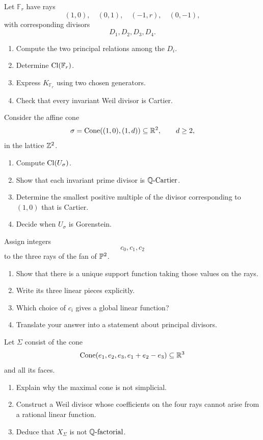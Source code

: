 \begin{exercises}
\item Let \(\mathbb F_r\) have rays
\[
(1,0),\quad
(0,1),\quad
(-1,r),\quad
(0,-1),
\]
with corresponding divisors
\[
D_1,D_2,D_3,D_4.
\]
\begin{enumerate}[label=(\alph*),wide=0pt]
\item Compute the two principal relations among the \(D_i\).
\item Determine \(\operatorname{Cl}(\mathbb F_r)\).
\item Express \(K_{\mathbb F_r}\) using two chosen generators.
\item Check that every invariant Weil divisor is Cartier.
\end{enumerate}

\item Consider the affine cone
\[
\sigma=\operatorname{Cone}((1,0),(1,d))
\subseteq\mathbb{R}^2,
\qquad
d\geq2,
\]
in the lattice \(\mathbb{Z}^2\).
\begin{enumerate}[label=(\alph*),wide=0pt]
\item Compute \(\operatorname{Cl}(U_\sigma)\).
\item Show that each invariant prime divisor is \(\mathbb{Q}\text{-Cartier}\).
\item Determine the smallest positive multiple of the divisor
corresponding to \((1,0)\) that is Cartier.
\item Decide when \(U_\sigma\) is Gorenstein.
\end{enumerate}

\item Assign integers
\[
c_0,c_1,c_2
\]
to the three rays of the fan of \(\mathbb{P}^2\).
\begin{enumerate}[label=(\alph*),wide=0pt]
\item Show that there is a unique support function taking those values
on the rays.
\item Write its three linear pieces explicitly.
\item Which choice of \(c_i\) gives a global linear function?
\item Translate your answer into a statement about principal
divisors.
\end{enumerate}

\item Let \(\Sigma\) consist of the cone
\[
\operatorname{Cone}(e_1,e_2,e_3,e_1+e_2-e_3)
\subseteq\mathbb{R}^3
\]
and all its faces.
\begin{enumerate}[label=(\alph*),wide=0pt]
\item Explain why the maximal cone is not simplicial.
\item Construct a Weil divisor whose coefficients on the four rays
cannot arise from a rational linear function.
\item Deduce that \(X_\Sigma\) is not \(\mathbb{Q}\text{-factorial}\).
\end{enumerate}


\end{exercises}
